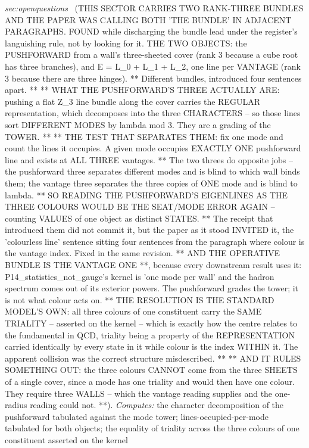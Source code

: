 \begin{description}
\textit{sec:openquestions} \ (THIS SECTOR CARRIES TWO RANK-THREE BUNDLES AND THE PAPER WAS CALLING BOTH 'THE BUNDLE' IN ADJACENT PARAGRAPHS. FOUND while discharging the bundle lead under the register's languishing rule, not by looking for it. THE TWO OBJECTS: the PUSHFORWARD from a wall's three-sheeted cover (rank 3 because a cube root has three branches), and E = L\_0 + L\_1 + L\_2, one line per VANTAGE (rank 3 because there are three hinges). ** Different bundles, introduced four sentences apart. ** ** WHAT THE PUSHFORWARD'S THREE ACTUALLY ARE: pushing a flat Z\_3 line bundle along the cover carries the REGULAR representation, which decomposes into the three CHARACTERS -- so those lines sort DIFFERENT MODES by lambda mod 3. They are a grading of the TOWER. ** ** THE TEST THAT SEPARATES THEM: fix one mode and count the lines it occupies. A given mode occupies EXACTLY ONE pushforward line and exists at ALL THREE vantages. ** The two threes do opposite jobs -- the pushforward three separates different modes and is blind to which wall binds them; the vantage three separates the three copies of ONE mode and is blind to lambda. ** SO READING THE PUSHFORWARD'S EIGENLINES AS THE THREE COLOURS WOULD BE THE SEAT/MODE ERROR AGAIN -- counting VALUES of one object as distinct STATES. ** The receipt that introduced them did not commit it, but the paper as it stood INVITED it, the 'colourless line' sentence sitting four sentences from the paragraph where colour is the vantage index. Fixed in the same revision. ** AND THE OPERATIVE BUNDLE IS THE VANTAGE ONE **, because every downstream result uses it: P14\_statistics\_not\_gauge's kernel is 'one mode per wall' and the hadron spectrum comes out of its exterior powers. The pushforward grades the tower; it is not what colour acts on. ** THE RESOLUTION IS THE STANDARD MODEL'S OWN: all three colours of one constituent carry the SAME TRIALITY -- asserted on the kernel -- which is exactly how the centre relates to the fundamental in QCD, triality being a property of the REPRESENTATION carried identically by every state in it while colour is the index WITHIN it. The apparent collision was the correct structure misdescribed. ** ** AND IT RULES SOMETHING OUT: the three colours CANNOT come from the three SHEETS of a single cover, since a mode has one triality and would then have one colour. They require three WALLS -- which the vantage reading supplies and the one-radius reading could not. **). 
\emph{Computes:} the character decomposition of the pushforward tabulated against the mode tower; lines-occupied-per-mode tabulated for both objects; the equality of triality across the three colours of one constituent asserted on the kernel

\end{description}

